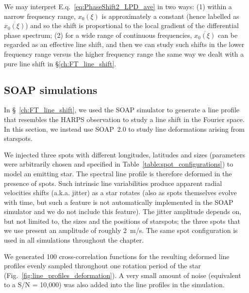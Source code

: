 We may interpret E.q.~\ref{eq:PhaseShift2_LPD_ave} in two ways: (1) within a narrow frequency range, $x_0(\xi)$ is approximately a constant (hence labelled as $\overline{x_0(\xi)}$) and so the shift is proportional to the local gradient of the differential phase spectrum; (2) for a wide range of continuous frequencies, $\overline{x_0(\xi)}$ can be regarded as an effective line shift, and then we can study such shifts in the lower frequency range versus the higher frequency range the same way we dealt with a pure line shift in \S\ref{ch:FT_line_shift}. 



\subsection{SOAP simulations}
\label{sec:Simulations}

In \S~\ref{ch:FT_line_shift}, we used the SOAP simulator to generate a line profile that resembles the HARPS observation to study a line shift in the Fourier space. In this section, we instead use SOAP~2.0 to study line deformations arising from starspots. 

We injected three spots with different longitudes, latitudes and sizes (parameters were arbitrarily chosen and specified in Table~\ref{table:spot_configurations}) to model an emitting star. The spectral line profile is therefore deformed in the presence of spots. Such intrinsic line variabilities produce apparent radial velocities shifts (a.k.a. jitter) as a star rotates (also as spots themselves evolve with time, but such a feature is not automatically implemented in the SOAP simulator and we do not include this feature). The jitter amplitude depends on, but not limited to, the sizes and the positions of starspots; the three spots that we use present an amplitude of roughly 2~m/s. The same spot configuration is used in all simulations throughout the chapter. 

We generated 100 cross-correlation functions for the resulting  deformed line profiles evenly sampled throughout one rotation period of the star (Fig.~\ref{fig:line_profiles_deformation}). A very small amount of noise (equivalent to a S/N = 10,000) was also added into the line profiles in the simulation. 

